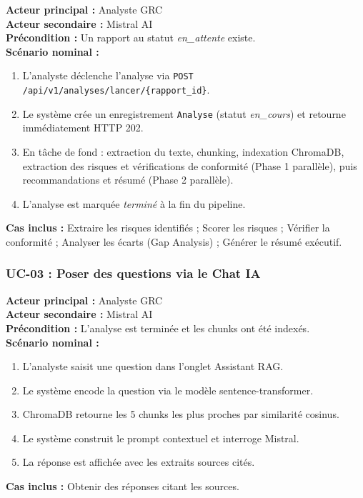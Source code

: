 \begin{tcolorbox}[colback=lightgray!20, colframe=darknavy, title=UC-02 — Lancer l'analyse automatique]
\textbf{Acteur principal :} Analyste GRC \\
\textbf{Acteur secondaire :} Mistral AI \\
\textbf{Précondition :} Un rapport au statut \textit{en\_attente} existe. \\
\textbf{Scénario nominal :}
\begin{enumerate}
  \item L'analyste déclenche l'analyse via
        \texttt{POST /api/v1/analyses/lancer/\{rapport\_id\}}.
  \item Le système crée un enregistrement \texttt{Analyse} (statut
        \textit{en\_cours}) et retourne immédiatement HTTP 202.
  \item En tâche de fond : extraction du texte, chunking, indexation
        ChromaDB, extraction des risques et vérifications de conformité
        (Phase 1 parallèle), puis recommandations et résumé (Phase 2
        parallèle).
  \item L'analyse est marquée \textit{terminé} à la fin du pipeline.
\end{enumerate}
\textbf{Cas inclus :} Extraire les risques identifiés ; Scorer les risques ;
Vérifier la conformité ; Analyser les écarts (Gap Analysis) ;
Générer le résumé exécutif.
\end{tcolorbox}

\subsubsection*{UC-03 : Poser des questions via le Chat IA}

\begin{tcolorbox}[colback=lightgray!20, colframe=darknavy, title=UC-03 — Poser des questions sur le rapport (RAG Chat)]
\textbf{Acteur principal :} Analyste GRC \\
\textbf{Acteur secondaire :} Mistral AI \\
\textbf{Précondition :} L'analyse est terminée et les chunks ont été indexés. \\
\textbf{Scénario nominal :}
\begin{enumerate}
  \item L'analyste saisit une question dans l'onglet Assistant RAG.
  \item Le système encode la question via le modèle sentence-transformer.
  \item ChromaDB retourne les 5 chunks les plus proches par similarité cosinus.
  \item Le système construit le prompt contextuel et interroge Mistral.
  \item La réponse est affichée avec les extraits sources cités.
\end{enumerate}
\textbf{Cas inclus :} Obtenir des réponses citant les sources.
\end{tcolorbox}

